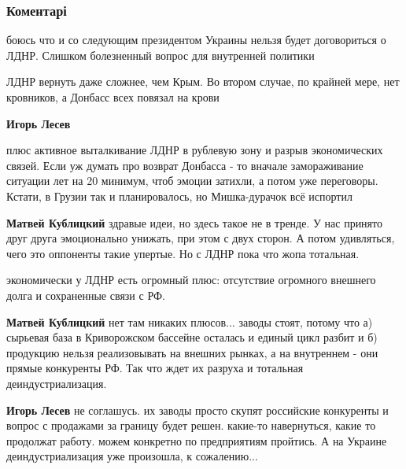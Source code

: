  
 
 
 
 
\subsubsection{Коментарі}

\begin{itemize} %
боюсь что и со следующим президентом Украины нельзя будет договориться о ЛДНР. Слишком болезненный вопрос для внутренней политики

\begin{itemize} %
ЛДНР вернуть даже сложнее, чем Крым. Во втором случае, по крайней мере, нет кровников, а Донбасс всех повязал на крови

\textbf{Игорь Лесев} 

плюс активное выталкивание ЛДНР в рублевую зону и разрыв экономических связей.
Если уж думать про возврат Донбасса - то вначале замораживание ситуации лет на
20 минимум, чтоб эмоции затихли, а потом уже переговоры. Кстати, в Грузии так и
планировалось, но Мишка-дурачок всё испортил

\textbf{Матвей Кублицкий} здравые идеи, но здесь такое не в тренде. У нас принято друг друга эмоционально унижать, при этом с двух сторон. А потом удивляться, чего это оппоненты такие упертые. Но с ЛДНР пока что жопа тотальная.

экономически у ЛДНР есть огромный плюс: отсутствие огромного внешнего долга и сохраненные связи с РФ.

\textbf{Матвей Кублицкий} нет там никаких плюсов... заводы стоят, потому что а) сырьевая база в Криворожском бассейне осталась и единый цикл разбит и б) продукцию нельзя реализовывать на внешних рынках, а на внутреннем - они прямые конкуренты РФ. Так что ждет их разруха и тотальная деиндустриализация.

\textbf{Игорь Лесев} не соглашусь. их заводы просто скупят российские конкуренты и вопрос с продажами за границу будет решен. какие-то навернуться, какие то продолжат работу. можем конкретно по предприятиям пройтись. А на Украине деиндустриализация уже произошла, к сожалению...


\end{itemize}
\end{itemize}
